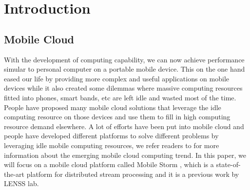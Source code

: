 \documentclass[journal,comsoc]{IEEEtran}
\begin{document}
%
\IEEEpeerreviewmaketitle
\section{Introduction}
\subsection{Mobile Cloud}
With the development of computing capability, we can now achieve performance simular to personal computer on a portable mobile device. This on the one hand eased our life by providing more complex and useful applications on mobile devices while it also created some dilemmas where massive computing resources fitted into phones, smart bands, etc are left idle and wasted most of the time. People have proposed many mobile cloud solutions that leverage the idle computing resource on those devices and use them to fill in high computing resource demand elsewhere. A lot of efforts have been put into mobile cloud and people have developed different platforms to solve different problems by leveraging idle mobile computing resources, we refer readers to \cite{kumar2010cloud} \cite{dinh2013survey} \cite{fernando2013mobile} for more information about the emerging mobile cloud computing trend. In this paper, we will focus on a mobile cloud platform called Mobile Storm \cite{ning2015mobile}, which is a state-of-the-art platform for distributed stream processing and it is a previous work by LENSS lab.
\end{document}
